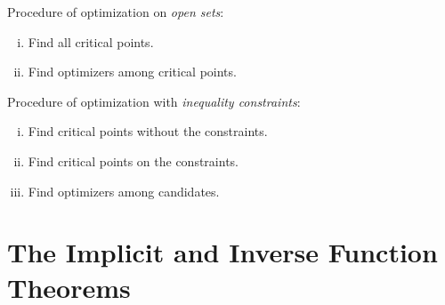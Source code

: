 \documentclass[11pt]{article}
\begin{document}
			\begin{remark}Procedure of optimization on \emph{open sets}:
				\begin{enumerate}[(i)]
					\item Find all critical points.
					\item Find optimizers among critical points.
				\end{enumerate}
			\end{remark}
			
			\begin{remark}Procedure of optimization with \emph{inequality constraints}:
				\begin{enumerate}[(i)]
					\item Find critical points without the constraints.
					\item Find critical points on the constraints.
					\item Find optimizers among candidates.
				\end{enumerate}
			\end{remark}
	
	\section{The Implicit and Inverse Function Theorems}
\end{document}
